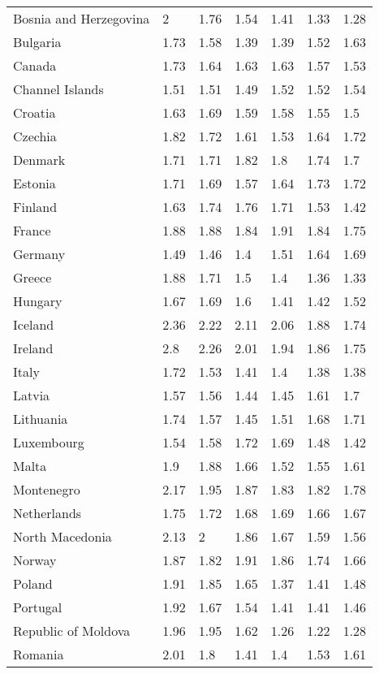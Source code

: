 \begin{longtable}[t]{lllllll}
Bosnia and Herzegovina & 2 & 1.76 & 1.54 & 1.41 & 1.33 & 1.28\\
Bulgaria & 1.73 & 1.58 & 1.39 & 1.39 & 1.52 & 1.63\\
Canada & 1.73 & 1.64 & 1.63 & 1.63 & 1.57 & 1.53\\
Channel Islands & 1.51 & 1.51 & 1.49 & 1.52 & 1.52 & 1.54\\
Croatia & 1.63 & 1.69 & 1.59 & 1.58 & 1.55 & 1.5\\
Czechia & 1.82 & 1.72 & 1.61 & 1.53 & 1.64 & 1.72\\
Denmark & 1.71 & 1.71 & 1.82 & 1.8 & 1.74 & 1.7\\
Estonia & 1.71 & 1.69 & 1.57 & 1.64 & 1.73 & 1.72\\
Finland & 1.63 & 1.74 & 1.76 & 1.71 & 1.53 & 1.42\\
France & 1.88 & 1.88 & 1.84 & 1.91 & 1.84 & 1.75\\
Germany & 1.49 & 1.46 & 1.4 & 1.51 & 1.64 & 1.69\\
Greece & 1.88 & 1.71 & 1.5 & 1.4 & 1.36 & 1.33\\
Hungary & 1.67 & 1.69 & 1.6 & 1.41 & 1.42 & 1.52\\
Iceland & 2.36 & 2.22 & 2.11 & 2.06 & 1.88 & 1.74\\
Ireland & 2.8 & 2.26 & 2.01 & 1.94 & 1.86 & 1.75\\
Italy & 1.72 & 1.53 & 1.41 & 1.4 & 1.38 & 1.38\\
Latvia & 1.57 & 1.56 & 1.44 & 1.45 & 1.61 & 1.7\\
Lithuania & 1.74 & 1.57 & 1.45 & 1.51 & 1.68 & 1.71\\
Luxembourg & 1.54 & 1.58 & 1.72 & 1.69 & 1.48 & 1.42\\
Malta & 1.9 & 1.88 & 1.66 & 1.52 & 1.55 & 1.61\\
Montenegro & 2.17 & 1.95 & 1.87 & 1.83 & 1.82 & 1.78\\
Netherlands & 1.75 & 1.72 & 1.68 & 1.69 & 1.66 & 1.67\\
North Macedonia & 2.13 & 2 & 1.86 & 1.67 & 1.59 & 1.56\\
Norway & 1.87 & 1.82 & 1.91 & 1.86 & 1.74 & 1.66\\
Poland & 1.91 & 1.85 & 1.65 & 1.37 & 1.41 & 1.48\\
Portugal & 1.92 & 1.67 & 1.54 & 1.41 & 1.41 & 1.46\\
Republic of Moldova & 1.96 & 1.95 & 1.62 & 1.26 & 1.22 & 1.28\\
Romania & 2.01 & 1.8 & 1.41 & 1.4 & 1.53 & 1.61\\

\end{longtable}
